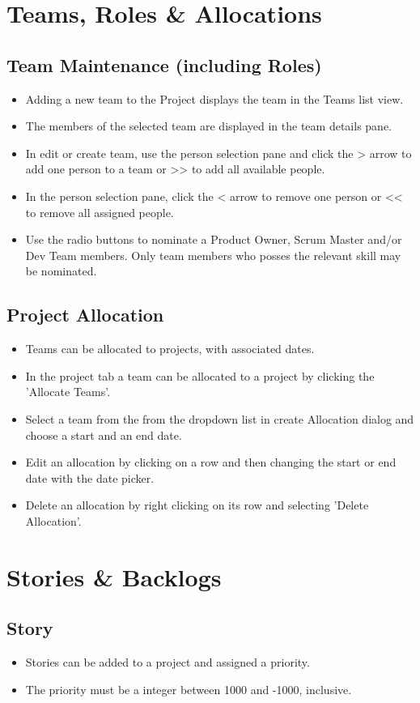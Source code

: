 \documentclass[11pt,fleqn]{book} %
\begin{document}
\section{Teams, Roles \& Allocations}
\subsection{Team Maintenance (including Roles)}
\begin{itemize}
  \item Adding a new team to the Project displays the team in the Teams list view.
  \item The members of the selected team are displayed in the team details pane.
  \item In edit or create team, use the person selection pane and click the > arrow to add one person to a team
  or >> to add all available people.
  \item In the person selection pane, click the < arrow to remove one person or << to remove all assigned people.
  \item Use the radio buttons to nominate a Product Owner, Scrum Master and/or Dev Team members. Only team members who
   posses the relevant skill may be nominated.
\end{itemize}

\subsection{Project Allocation}
\begin{itemize}
  \item Teams can be allocated to projects, with associated dates.
  \item In the project tab a team can be allocated to a project by clicking the 'Allocate Teams'.
  \item Select a team from the from the dropdown list in create Allocation dialog and choose a start and an end date.
  \item Edit an allocation by clicking on a row and then changing the start or end date with the date picker.
  \item Delete an allocation by right clicking on its row and selecting 'Delete Allocation'.
\end{itemize}
\section{Stories \& Backlogs}

\subsection{Story}
\begin{itemize}
  \item Stories can be added to a project and assigned a priority.
  \item The priority must be a integer between 1000 and -1000, inclusive.
\end{itemize}
\end{document}
